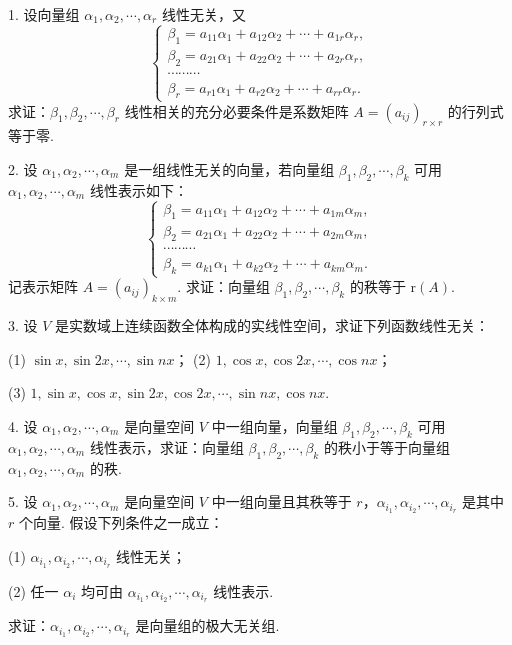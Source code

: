 \documentclass[UTF8,12pt,a4paper,fontset=fandol]{ctexart}
\begin{document}
1. 设向量组 $\alpha_1,\alpha_2,\cdots,\alpha_r$ 线性无关，又
\[
\left\{\begin{array}{c}
\beta_1=a_{11}\alpha_1+a_{12}\alpha_2+\cdots+a_{1r}\alpha_r,\\
\beta_2=a_{21}\alpha_1+a_{22}\alpha_2+\cdots+a_{2r}\alpha_r,\\
\cdots\cdots\cdots\\
\beta_r=a_{r1}\alpha_1+a_{r2}\alpha_2+\cdots+a_{rr}\alpha_r.
\end{array}\right.
\]
求证：$\beta_1,\beta_2,\cdots,\beta_r$ 线性相关的充分必要条件是系数矩阵 $A=(a_{ij})_{r\times r}$ 的行列式等于零.

2. 设 $\alpha_1,\alpha_2,\cdots,\alpha_m$ 是一组线性无关的向量，若向量组 $\beta_1,\beta_2,\cdots,\beta_k$ 可用 $\alpha_1,\alpha_2,\cdots,\alpha_m$ 线性表示如下：
\[
\left\{\begin{array}{c}
\beta_1=a_{11}\alpha_1+a_{12}\alpha_2+\cdots+a_{1m}\alpha_m,\\
\beta_2=a_{21}\alpha_1+a_{22}\alpha_2+\cdots+a_{2m}\alpha_m,\\
\cdots\cdots\cdots\\
\beta_k=a_{k1}\alpha_1+a_{k2}\alpha_2+\cdots+a_{km}\alpha_m.
\end{array}\right.
\]
记表示矩阵 $A=(a_{ij})_{k\times m}$. 求证：向量组 $\beta_1,\beta_2,\cdots,\beta_k$ 的秩等于 $\mathrm{r}(A)$.

3. 设 $V$ 是实数域上连续函数全体构成的实线性空间，求证下列函数线性无关：

(1) $\sin x,\sin 2x,\cdots,\sin nx$；\qquad
(2) $1,\cos x,\cos 2x,\cdots,\cos nx$；

(3) $1,\sin x,\cos x,\sin 2x,\cos 2x,\cdots,\sin nx,\cos nx$.

4. 设 $\alpha_1,\alpha_2,\cdots,\alpha_m$ 是向量空间 $V$ 中一组向量，向量组 $\beta_1,\beta_2,\cdots,\beta_k$ 可用 $\alpha_1,\alpha_2,\cdots,\alpha_m$ 线性表示，求证：向量组 $\beta_1,\beta_2,\cdots,\beta_k$ 的秩小于等于向量组 $\alpha_1,\alpha_2,\cdots,\alpha_m$ 的秩.

5. 设 $\alpha_1,\alpha_2,\cdots,\alpha_m$ 是向量空间 $V$ 中一组向量且其秩等于 $r$，$\alpha_{i_1},\alpha_{i_2},\cdots,\alpha_{i_r}$ 是其中 $r$ 个向量. 假设下列条件之一成立：

(1) $\alpha_{i_1},\alpha_{i_2},\cdots,\alpha_{i_r}$ 线性无关；

(2) 任一 $\alpha_i$ 均可由 $\alpha_{i_1},\alpha_{i_2},\cdots,\alpha_{i_r}$ 线性表示.

求证：$\alpha_{i_1},\alpha_{i_2},\cdots,\alpha_{i_r}$ 是向量组的极大无关组.
\end{document}
